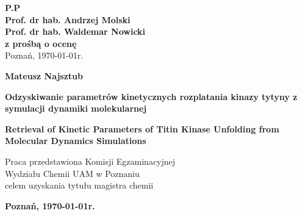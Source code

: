 \begin{titlepage}
{\thispagestyle{empty}

\begin{flushright}
\begin{minipage}{7.5cm}
\begin{flushleft}
\textbf{P.P\\
Prof. dr hab. Andrzej Molski\\
Prof. dr hab. Waldemar Nowicki\\
z prośbą o ocenę\\
}
\vspace{0.5cm}
{Poznań, \today r.}
\vspace{2.5cm}
\end{flushleft}
\end{minipage}
\end{flushright}
\begin{center}
\large{\textbf{Mateusz Najsztub}}\\
\end{center}
\begin{center}
\vspace{0.5cm}
\begin{singlespace}
\LARGE{\textbf{Odzyskiwanie parametrów kinetycznych rozplatania kinazy tytyny z symulacji dynamiki molekularnej}} \\
\end{singlespace}
\end{center}
\begin{center}
\vspace{3mm}
\begin{singlespace}
\LARGE{\textbf{Retrieval of Kinetic Parameters of Titin Kinase Unfolding from Molecular Dynamics Simulations}}\\
\end{singlespace}
\end{center}

\setlength{\parskip}{2cm}

\begin{flushright}
\begin{minipage}{10cm}
\begin{center}

Praca przedstawiona Komisji Egzaminacyjnej\\
Wydziału Chemii UAM 
w Poznaniu\\
celem uzyskania tytułu magistra chemii\\
\end{center}
\end{minipage}
\end{flushright}
\setlength{\parskip}{3cm}
\begin{center}
{\large{\textbf{Poznań, \today r.}}}
\end{center}
}
\end{titlepage}
